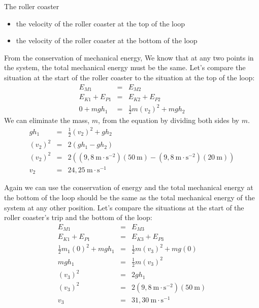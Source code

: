 \begin{wex}{The roller coaster}
{
\begin{itemize}
\item the velocity of the roller coaster at the top of the loop
\item the velocity of the roller coaster at the bottom of the loop
\end{itemize}

From the conservation of mechanical energy, We know that at any two points in the system, the total mechanical energy must be the same. Let's compare the situation at the start of the roller coaster to the situation at the top of the loop:
\begin{eqnarray*}
E_{M1} & = & E_{M2} \\
E_{K1} + E_{P1} & = & E_{K2} + E_{P2} \\
0 + mgh_{1} &=& \frac{1}{2}m(v_{2})^2 + mgh_{2} 
\end{eqnarray*}
We can eliminate the mass, $m$, from the equation by dividing both sides by $m$.
\begin{eqnarray*}
gh_{1} &=&  \frac{1}{2}(v_{2})^2 + gh_{2} \\
(v_{2})^2 &=& 2(gh_{1} - gh_{2}) \\
(v_{2})^2 &=& 2((9,8~\text{m}\cdot \text{s}^{-2})(50~\text{m}) - (9,8~\text{m}\cdot \text{s}^{-2})(20~\text{m})) \\
v_{2} &=& 24,25 \ \text{m}\cdot \text{s}^{-1}
\end{eqnarray*}

Again we can use the conservation of energy and the total mechanical energy at the bottom of the loop should be the same as the total mechanical energy of the system at any other position. 
Let's compare the situations at the start of the roller coaster's trip and the bottom of the loop:
\begin{eqnarray*}
E_{M1} & = & E_{M3} \\
E_{K1} + E_{P1} & = & E_{K3} + E_{P3} \\
\frac{1}{2}m_{1}(0)^2 + mgh_{1} &=& \frac{1}{2}m(v_{3})^2 + mg(0) \\
mgh_{1} &=&  \frac{1}{2}m(v_{3})^2 \\
(v_3)^2 &=& 2gh_1 \\
(v_3)^2 &=& 2(9,8~\text{m}\cdot \text{s}^{-2})(50~\text{m}) \\
v_3 &=& 31,30 \ \text{m} \cdot \text{s}^{-1}
\end{eqnarray*}

}
\end{wex}


